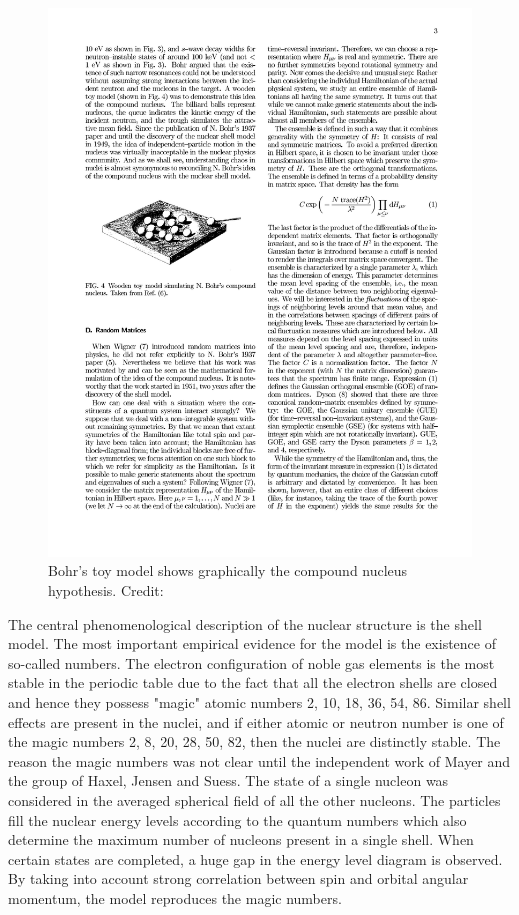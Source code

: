 \begin{figure}
\includegraphics[width=\textwidth]{1}
\caption{Bohr's toy model shows graphically the compound nucleus hypothesis. Credit:\cite{bo36}}
\label{fig:1}
\end{figure}

The central phenomenological description of the nuclear structure is the shell model. The most important empirical evidence for the model is the existence of so-called  numbers. The electron configuration of noble gas elements is the most stable in the periodic table due to the fact that all the electron shells are closed and hence they possess "magic" atomic numbers 2, 10, 18, 36, 54, 86. Similar shell effects are present in the nuclei, and if either atomic or neutron number is one of the magic numbers 2, 8, 20, 28, 50, 82, then the nuclei are distinctly stable.\cite{hand} The reason  the magic numbers was not clear until the independent work of Mayer\cite{mayer} and the group of Haxel, Jensen and Suess\cite{haxel}. The state of a single nucleon was considered in the averaged spherical field of all the other nucleons. The particles fill the nuclear energy levels according to the quantum numbers which also determine the maximum number of nucleons present in a single shell. When certain states are completed, a huge gap in the energy level diagram is observed. By taking into account strong correlation between spin and orbital angular momentum, the model reproduces the magic numbers.\cite{hand}

